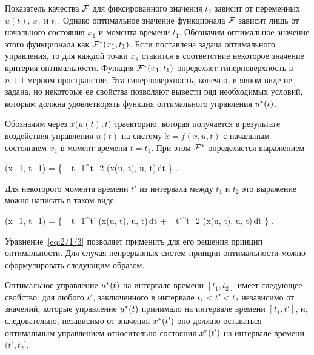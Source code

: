 Показатель качества $\mathcal{F}$ для фиксированного значения $t_2$ зависит от переменных $u(t)$, $x_1$ и $t_1$. Однако оптимальное значение функционала $\mathcal{F}$ зависит лишь от начального состояния $x_1$ и момента времени $t_1$. Обозначим оптимальное значение этого функционала как $\mathcal{F}^{*}(x_1, t_1)$. Если поставлена задача оптимального управления, то для каждой точки $x_1$ ставится в соответствие некоторое значение критерия оптимальности. Функция $\mathcal{F}^{*}(x_1, t_1)$ определяет гиперповерхность в $n+1$-мерном пространстве. Эта гиперповерхность, конечно, в явном виде не задана, но некоторые ее свойства позволяют вывести ряд необходимых условий, которым должна удовлетворять функция оптимального управления $u^{*}(t)$.

Обозначим через $x \bigl( u(t), t \bigr)$ траекторию, которая получается в результате воздействия управления $u(t)$ на систему $\dot{x} = f(x, u, t)$ с начальным состоянием $x_1$ в момент времени $t = t_1$. При этом $\mathcal{F}^{*}$ определяется выражением

    \optF(x_1, t_1) =  \biggl\{ \int\limits_{t_1}^{t_2} \funcL\bigl(x(u, t), u, t\bigr)\,dt \biggr\} \mbox{.}
\eeq

Для некоторого момента времени $t'$ из интервала между $t_1$ и $t_2$ это выражение можно написать в таком виде:

    \optF(x_1, t_1) =  \biggl\{ \int\limits_{t_1}^{t'} \funcL\bigl(x(u, t), u, t\bigr)\,dt + \int\limits_{t'}^{t_2} \funcL\bigl(x(u, t), u, t\bigr)\,dt \biggr\} \mbox{.}
\eeq

Уравнение~\ref{eq:2/1/3} позволяет применить для его решения принцип оптимальности. Для случая непрерывных систем принцип оптимальности можно сформулировать следующим образом.

\begin{statement}
	Оптимальное управление $u^{*}(t)$ на интервале времени $[t_1, t_2]$ имеет следующее свойство: для любого $t'$, заключенного в интервале $t_1 < t' < t_2$ независимо от значений, которые управление $u^{*}(t)$ принимало на интервале времени $[t_1, t']$, и, следовательно, независимо от значения $x^{*}(t')$ оно должно оставаться оптимальным управлением относительно состояния $x^{*}(t')$ на интервале времени $(t', t_2]$.
\end{statement}

